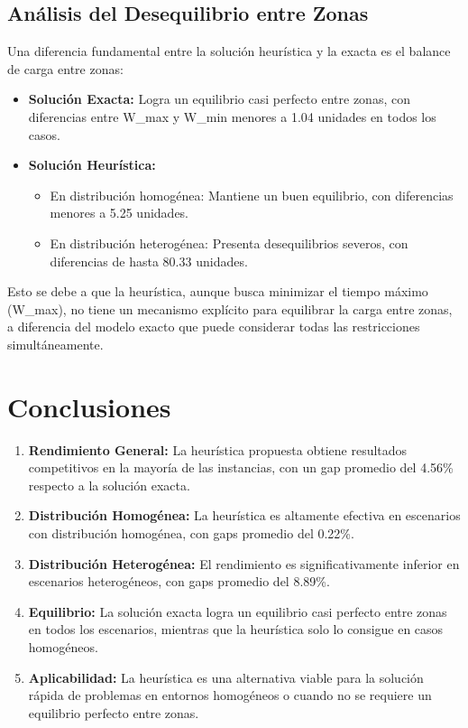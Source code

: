 \documentclass{hw-template}
\begin{document}
\subsection{Análisis del Desequilibrio entre Zonas}

Una diferencia fundamental entre la solución heurística y la exacta es el balance de carga entre zonas:

\begin{itemize}
    \item \textbf{Solución Exacta:} Logra un equilibrio casi perfecto entre zonas, con diferencias entre W\_max y W\_min menores a 1.04 unidades en todos los casos.
    
    \item \textbf{Solución Heurística:} 
    \begin{itemize}
        \item En distribución homogénea: Mantiene un buen equilibrio, con diferencias menores a 5.25 unidades.
        \item En distribución heterogénea: Presenta desequilibrios severos, con diferencias de hasta 80.33 unidades.
    \end{itemize}
\end{itemize}

Esto se debe a que la heurística, aunque busca minimizar el tiempo máximo (W\_max), no tiene un mecanismo explícito para equilibrar la carga entre zonas, a diferencia del modelo exacto que puede considerar todas las restricciones simultáneamente.


\section{Conclusiones}

\begin{enumerate}
    \item \textbf{Rendimiento General:} La heurística propuesta obtiene resultados competitivos en la mayoría de las instancias, con un gap promedio del 4.56\% respecto a la solución exacta.
    
    \item \textbf{Distribución Homogénea:} La heurística es altamente efectiva en escenarios con distribución homogénea, con gaps promedio del 0.22\%.
    
    \item \textbf{Distribución Heterogénea:} El rendimiento es significativamente inferior en escenarios heterogéneos, con gaps promedio del 8.89\%.
    
    \item \textbf{Equilibrio:} La solución exacta logra un equilibrio casi perfecto entre zonas en todos los escenarios, mientras que la heurística solo lo consigue en casos homogéneos.
    
    \item \textbf{Aplicabilidad:} La heurística es una alternativa viable para la solución rápida de problemas en entornos homogéneos o cuando no se requiere un equilibrio perfecto entre zonas.
\end{enumerate}
\end{document}

